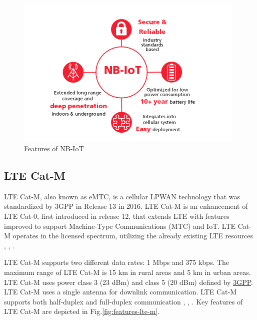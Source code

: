 \begin{figure}[h!]
    \centering
    \includegraphics[width=0.98\textwidth]{pict/nb-iot.png}
    \caption{Features of NB-IoT \cite{ubox_nb-iot}}
    \label{fig:features_of_nb-iot}
\end{figure}

\subsection{LTE Cat-M}
LTE Cat-M, also known as eMTC, is a cellular LPWAN technology that was standardized by 3GPP in Release 13 in 2016. LTE Cat-M is an enhancement of LTE Cat-0, first introduced in release 12, that extends LTE with features improved to support Machine-Type Communications (MTC) and IoT. LTE Cat-M operates in the licensed spectrum, utilizing the already existing LTE resources \cite{icumt2019-lte-cat-m}, \cite{ubox_lte-cat-m}, \cite{Masek2021}.

LTE Cat-M supports two different data rates: 1 Mbps and 375 kbps. The maximum range of LTE Cat-M is 15 km in rural areas and 5 km in urban areas. LTE Cat-M uses power class 3 (23 dBm) and class 5 (20 dBm) defined by \href{https://www.3gpp.org/news-events/3gpp-news/nb-iot-complete}{3GPP}. LTE Cat-M uses a single antenna for downlink communication. LTE Cat-M supports both half-duplex and full-duplex communication \cite{icumt2019-lte-cat-m}, \cite{ubox_lte-cat-m}, \cite{Masek2021}. Key features of LTE Cat-M are depicted in Fig.\ref{fig:features-lte-m}.

